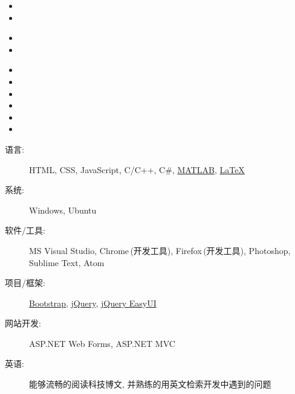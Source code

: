 \documentclass[letterpaper,11pt]{article}
\begin{document}
  \begin{itemize}
    \item
    \item
  \end{itemize}

  \begin{itemize}
    \item
    \item
  \end{itemize}

\newpage

  \begin{itemize}
    \item {}
    \item {}
    \item {}
    \item {}
    \item {}
    \item {}
  \end{itemize}

  \begin{description}
    \item[语言:] HTML, CSS, JavaScript, C/C++, C\#, \href{http://cn.mathworks.com/products/matlab/}{MATLAB}, \href{http://www.latex-project.org/}{\LaTeX}
    \item[系统:] Windows, Ubuntu
    \item[软件/工具:] MS Visual Studio, Chrome$\,$(开发工具), Firefox$\,$(开发工具), Photoshop, Sublime Text, Atom
    \item[项目/框架:] \href{http://www.bootcss.com/}{Bootstrap}, \href{https://jquery.com/}{jQuery}, \href{http://jeasyui.com/}{jQuery EasyUI}
    \item[网站开发:] ASP.NET Web Forms, ASP.NET MVC
    \item[英语:] 能够流畅的阅读科技博文, 并熟练的用英文检索开发中遇到的问题
  \end{description}

\end{document}
